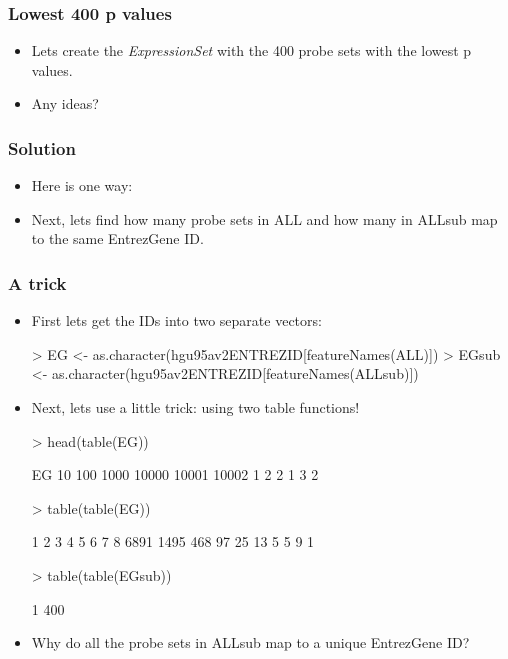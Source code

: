 \begin{frame}
  \frametitle{Lowest 400 p values}
  \begin{itemize}
  \item Lets create the  \emph{ExpressionSet} with the 400 probe sets with the lowest p values.
  \item Any ideas?
  \end{itemize}
\end{frame}

\begin{frame}
  \frametitle{Solution}
  \begin{itemize}
  \item Here is one way:
\begin{Schunk}
\end{Schunk}
  \item Next, lets find how many probe sets in ALL and how many in ALLsub map to the same EntrezGene ID.
  \end{itemize}
\end{frame}

\begin{frame}
  \frametitle{A trick}
  \begin{itemize}
  \item First lets get the IDs into two separate vectors:
\begin{Schunk}
\begin{Sinput}
> EG <- as.character(hgu95av2ENTREZID[featureNames(ALL)])
> EGsub <- as.character(hgu95av2ENTREZID[featureNames(ALLsub)])
\end{Sinput}
\end{Schunk}
  \item Next, lets use a little trick: using two table functions!
\begin{Schunk}
\begin{Sinput}
> head(table(EG))
\end{Sinput}
\begin{Soutput}
EG
   10   100  1000 10000 10001 10002 
    1     2     2     1     3     2 
\end{Soutput}
\begin{Sinput}
> table(table(EG))
\end{Sinput}
\begin{Soutput}
   1    2    3    4    5    6    7    8 
6891 1495  468   97   25   13    5    5 
   9 
   1 
\end{Soutput}
\begin{Sinput}
> table(table(EGsub))
\end{Sinput}
\begin{Soutput}
  1 
400 
\end{Soutput}
\end{Schunk}
  \item Why do all the probe sets in ALLsub map to a unique EntrezGene ID?
  \end{itemize}
\end{frame}

